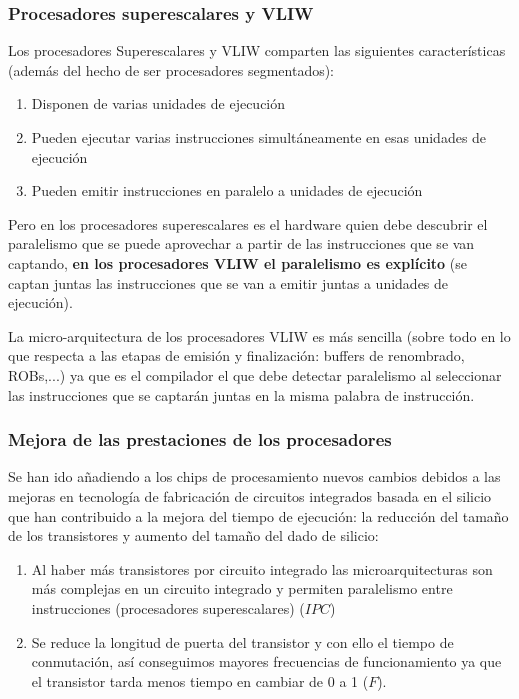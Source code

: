 \documentclass[10pt,a4paper,spanish]{report}
\begin{document}
\textcolor{azul}{\subsubsection{Procesadores superescalares y VLIW}}
Los procesadores Superescalares y VLIW comparten las siguientes características (además del hecho de ser procesadores segmentados):

\begin{enumerate}[\color{azul}{$\heartsuit$}]
    \item Disponen de varias unidades de ejecución
    \item Pueden ejecutar varias instrucciones simultáneamente en esas unidades de ejecución
    \item Pueden emitir instrucciones en paralelo a unidades de ejecución
\end{enumerate}

Pero en los procesadores superescalares es el hardware quien debe descubrir el paralelismo que se puede aprovechar a partir de las instrucciones que se van captando, \textbf{\textcolor{azul}{en los procesadores VLIW el paralelismo es explícito}} (se captan juntas las instrucciones que se van a emitir juntas a unidades de ejecución).

La micro-arquitectura de los procesadores VLIW es más sencilla (sobre todo en lo que respecta a las etapas de emisión y finalización: buffers de renombrado, ROBs,...) ya que es el compilador el que debe detectar paralelismo al seleccionar las instrucciones que se captarán juntas en la misma palabra de instrucción.

\newpage
\textcolor{azul}{\subsubsection{Mejora de las prestaciones de los procesadores}}
Se han ido añadiendo a los chips de procesamiento nuevos cambios debidos a las mejoras en tecnología de fabricación de circuitos integrados basada en el silicio que han contribuido a la mejora del tiempo de ejecución: la reducción del tamaño de los transistores y aumento del tamaño del dado de silicio:
\begin{enumerate}[\color{azul}{$\heartsuit$}]
    \item Al haber más transistores por circuito integrado las microarquitecturas son más complejas en un circuito integrado y permiten paralelismo entre instrucciones (procesadores superescalares) ($IPC$)

    \item Se reduce la longitud de puerta del transistor y con ello el tiempo de conmutación, así conseguimos mayores frecuencias de funcionamiento ya que el transistor tarda menos tiempo en cambiar de 0 a 1 ($F$).
\end{enumerate}
\end{document}
